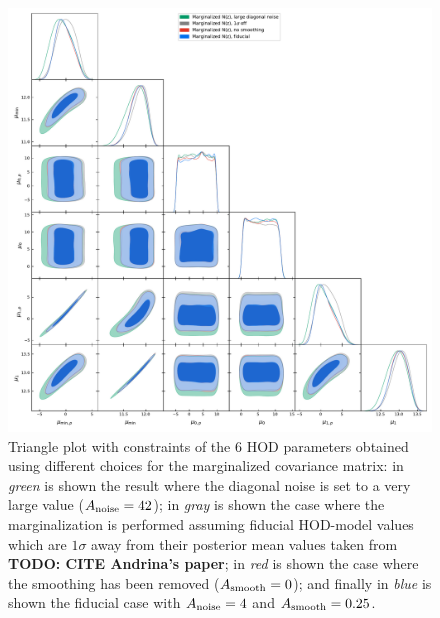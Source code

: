 \documentclass[a4paper,11pt]{article}
\newcommand{\todo}[1]{{\bf TODO: #1}}
\begin{document}
\begin{figure}[ht]
\centering  
\includegraphics[width=1.\textwidth]{./triangle_marg_tests}
\caption{Triangle plot with constraints of the 6 HOD parameters obtained using different choices for the marginalized covariance matrix: in \textit{green} is shown the result where the diagonal noise is set to a very large value ($A_{\rm noise} = 42$); in \textit{gray} is shown the case where the marginalization is performed assuming fiducial HOD-model values which are $1\sigma$ away from their posterior mean values taken from \todo{CITE Andrina's paper}; in \textit{red} is shown the case where the smoothing has been removed ($A_{\rm smooth} = 0$); and finally in \textit{blue} is shown the fiducial case with $A_{\rm noise} = 4$ and $A_{\rm smooth} = 0.25$.}
\label{fig:triangle_marg_tests}
\end{figure}
\end{document}

